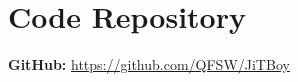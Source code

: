 \section{Code Repository}
\label{appendix:code}

\textbf{GitHub:} \url{https://github.com/QFSW/JiTBoy}
